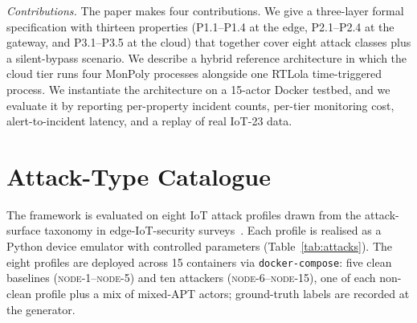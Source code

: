 \documentclass[runningheads]{llncs}
\begin{document}
\emph{Contributions.}
The paper makes four contributions.  We give a three-layer
formal specification with thirteen properties (P1.1--P1.4 at the
edge, P2.1--P2.4 at the gateway, and P3.1--P3.5 at the cloud)
that together cover eight attack classes plus a silent-bypass
scenario.  We describe a hybrid reference architecture in which
the cloud tier runs four MonPoly processes alongside one
RTLola time-triggered process.  We instantiate the architecture
on a 15-actor Docker testbed, and we evaluate it by reporting
per-property incident counts, per-tier monitoring cost,
alert-to-incident latency, and a replay of real IoT-23 data.



\section{Attack-Type Catalogue}
\label{sec:attacks}

The framework is evaluated on eight IoT attack profiles drawn
from the attack-surface taxonomy in edge-IoT-security
surveys~\cite{cavalli2024iotsec}.  Each profile is realised as a
Python device emulator with controlled parameters
(Table~\ref{tab:attacks}).  The eight profiles are deployed
across 15 containers via \texttt{docker-compose}: five clean
baselines (\textsc{node-1}--\textsc{node-5}) and ten attackers
(\textsc{node-6}--\textsc{node-15}), one of each non-clean
profile plus a mix of mixed-APT actors; ground-truth labels are
recorded at the generator.
\end{document}
